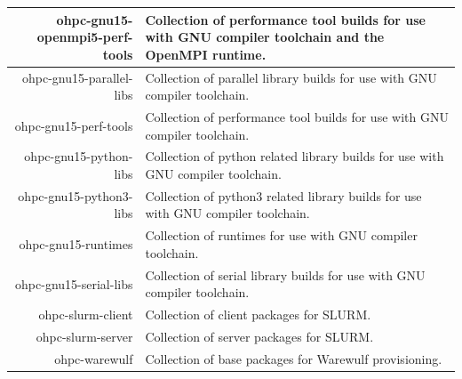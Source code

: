 \begin{tabularx}{\textwidth}{r|X}
\hline
ohpc-gnu15-openmpi5-perf-tools & Collection of performance tool builds for use with GNU compiler toolchain and the OpenMPI runtime. \\
\hline
ohpc-gnu15-parallel-libs & Collection of parallel library builds for use with GNU compiler toolchain. \\
\hline
ohpc-gnu15-perf-tools & Collection of performance tool builds for use with GNU compiler toolchain. \\
\hline
ohpc-gnu15-python-libs & Collection of python related library builds for use with GNU compiler toolchain. \\
\hline
ohpc-gnu15-python3-libs & Collection of python3 related library builds for use with GNU compiler toolchain. \\
\hline
ohpc-gnu15-runtimes & Collection of runtimes for use with GNU compiler toolchain. \\
\hline
ohpc-gnu15-serial-libs & Collection of serial library builds for use with GNU compiler toolchain. \\
\hline
ohpc-slurm-client & Collection of client packages for SLURM. \\
\hline
ohpc-slurm-server & Collection of server packages for SLURM. \\
\hline
ohpc-warewulf & Collection of base packages for Warewulf provisioning. \\
\hline
\bottomrule
\end{tabularx}
